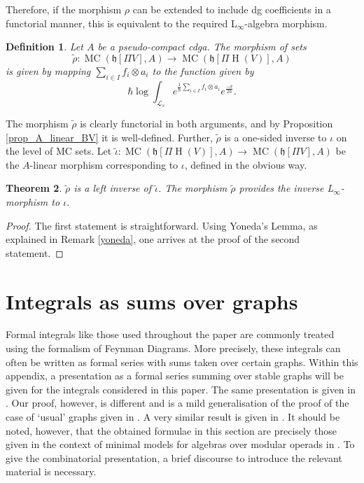 \documentclass[]{amsart}
\newtheorem{theorem}{Theorem}[section]
\newtheorem{definition}[theorem]{Definition}
\theoremstyle{definition}
\newcommand{\Linf}{L$_\infty$}
\newcommand{\MC}{\operatorname{MC}}
\newcommand{\homology}{\operatorname{H}}
\begin{document}
Therefore, if the morphism $\rho$ can be extended to include dg coefficients in a functorial manner, this is equivalent to the required \Linf-algebra morphism.

\begin{definition}
Let $A$ be a pseudo-compact cdga. The morphism of sets
\[
\tilde{\rho} \colon \MC (\mathfrak{h}[\Pi V],A)\to\MC (\mathfrak{h}[\Pi \homology (V)],A)
\]
is given by mapping $\sum_{i\in I}f_i\otimes a_i $ to the function given by
\[
\hbar\log\int_{\mathcal{L}_s} e^{\frac{1}{\hbar}\sum_{i\in I} f_i\otimes a_i} e^{\frac{-\sigma}{2\hbar}}.
\]
\end{definition}

The morphism $\tilde{\rho}$ is clearly functorial in both arguments, and by Proposition \ref{prop_A_linear_BV} it is well-defined. Further, $\tilde{\rho}$ is a one-sided inverse to $\iota$ on the level of MC sets. Let $\tilde{\iota}\colon \MC (\mathfrak{h}[\Pi \homology (V)],A)\to \MC (\mathfrak{h}[\Pi V],A)$ be the $A$-linear morphism corresponding to $\iota$, defined in the obvious way.

\begin{theorem}\label{thm_inverse}
$\tilde{\rho}$ is a left inverse of $\tilde{\iota}$. The morphism $\tilde{\rho}$ provides the inverse \Linf-morphism to $\iota$.
\end{theorem}
\begin{proof}
The first statement is straightforward. Using Yoneda's Lemma, as explained in Remark \ref{yoneda}, one arrives at the proof of the second statement.
\end{proof}

\appendix

\section{Integrals as sums over graphs}\label{sec_appendix}

Formal integrals like those used throughout the paper are commonly treated using the formalism of Feynman Diagrams. More precisely, these integrals can often be written as formal series with sums taken over certain graphs. Within this appendix, a presentation as a formal series summing over stable graphs will be given for the integrals considered in this paper. The same presentation is given in \cite[Chapter 2, Section 3]{costello}. Our proof, however, is different and is a mild generalisation of the proof of the case of `usual' graphs given in \cite{etingof}. A very similar result is given in \cite[Example 3.10]{fiorenza_murri}. It should be noted, however, that the obtained formulae in this section are precisely those given in the context of minimal models for algebras over modular operads in \cite{chuang_laz_feynman}. To give the combinatorial presentation, a brief discourse to introduce the relevant material is necessary.
\end{document}
